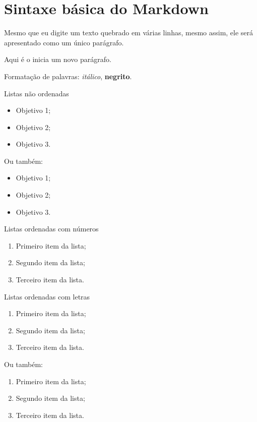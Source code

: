 \documentclass[
	12pt,				%
  openright,			%
	twoside,			%
	a4paper,			%
	english,			%
	french,				%
	spanish,			%
	brazil				%
	]{abntex2}
\begin{document}
\section{Sintaxe básica do
Markdown}\label{sintaxe-buxe1sica-do-markdown}

Mesmo que eu digite um texto quebrado em várias linhas, mesmo assim, ele
será apresentado como um único parágrafo.

Aqui é o inicia um novo parágrafo.

Formatação de palavras: \emph{itálico}, \textbf{negrito}.

Listas não ordenadas

\begin{itemize}
\tightlist
\item
  Objetivo 1;
\item
  Objetivo 2;
\item
  Objetivo 3.
\end{itemize}

Ou também:

\begin{itemize}
\tightlist
\item
  Objetivo 1;
\item
  Objetivo 2;
\item
  Objetivo 3.
\end{itemize}

Listas ordenadas com números

\begin{enumerate}
\def\labelenumi{\arabic{enumi}.}
\tightlist
\item
  Primeiro item da lista;
\item
  Segundo item da lista;
\item
  Terceiro item da lista.
\end{enumerate}

Listas ordenadas com letras

\begin{enumerate}
\def\labelenumi{\alph{enumi}.}
\tightlist
\item
  Primeiro item da lista;
\item
  Segundo item da lista;
\item
  Terceiro item da lista.
\end{enumerate}

Ou também:

\begin{enumerate}
\def\labelenumi{\alph{enumi})}
\tightlist
\item
  Primeiro item da lista;
\item
  Segundo item da lista;
\item
  Terceiro item da lista.
\end{enumerate}
\end{document}

